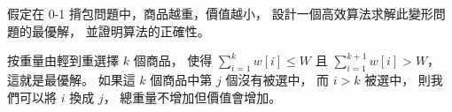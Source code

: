 \startEXERCISE
假定在 0-1 揹包問題中，商品越重，價值越小，
設計一個高效算法求解此變形問題的最優解，
並證明算法的正確性。
\stopEXERCISE

\startANSWER
按重量由輕到重選擇 $k$ 個商品，
使得 $\sum_{i=1}^k w[i] \le W$ 且 $\sum_{i=1}^{k+1} w[i] > W$，
這就是最優解。
如果這 $k$ 個商品中第 $j$ 個沒有被選中，
而 $i>k$ 被選中，
則我們可以將 $i$ 換成 $j$，
總重量不增加但價值會增加。
\stopANSWER
